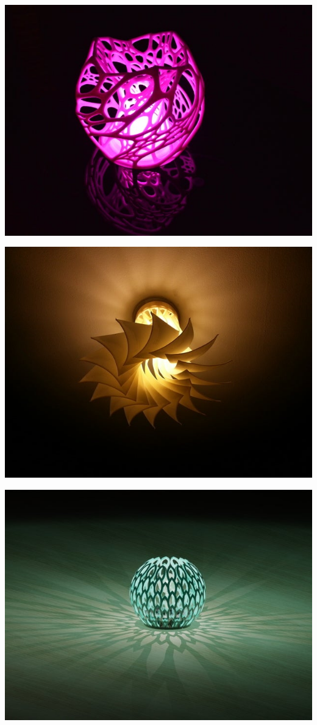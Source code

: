 \documentclass[11pt]{article}
\begin{document}
\begin{center}
\includegraphics[width=.9\linewidth]{./samples/bulb1.jpg}
\end{center}
\begin{center}
\includegraphics[width=.9\linewidth]{./samples/bulb3.jpg}
\end{center}
\begin{center}
\includegraphics[width=.9\linewidth]{./samples/bulb4.jpg}
\end{center}
\end{document}
